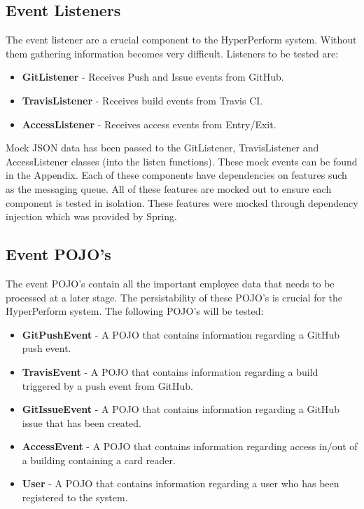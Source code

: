 \documentclass[11pt,a4paper]{article}
\begin{document}
\subsection{Event Listeners}
The event listener are a crucial component to the HyperPerform system. Without them gathering information becomes very difficult. Listeners to be tested are:
\begin{itemize}
	\item \textbf{GitListener} - Receives Push and Issue events from GitHub.
	\item \textbf{TravisListener} - Receives build events from Travis CI.
	\item \textbf{AccessListener} - Receives access events from Entry/Exit.
\end{itemize}

Mock JSON data has been passed to the GitListener, TravisListener and AccessListener classes (into the listen functions). These mock events can be found in the Appendix.
Each of these components have dependencies on features such as the messaging queue. All of these features are mocked out to ensure each component is tested in isolation. These features were mocked through dependency injection which was provided by Spring.

\subsection{Event POJO's}
The event POJO's contain all the important employee data that needs to be processed at a later stage. The persistability of these POJO's is crucial for the HyperPerform system. The following POJO's will be tested:
\begin{itemize}
	\item \textbf{GitPushEvent} - A POJO that contains information regarding a GitHub push event.
	\item \textbf{TravisEvent} - A POJO that contains information regarding a build triggered by a push event from GitHub.
	\item \textbf{GitIssueEvent} - A POJO that contains information regarding a GitHub issue that has been created.
	\item \textbf{AccessEvent} - A POJO that contains information regarding access in/out of a building containing a card reader.
	\item \textbf{User} - A POJO that contains information regarding a user who has been registered to the system.
\end{itemize}
\end{document}
